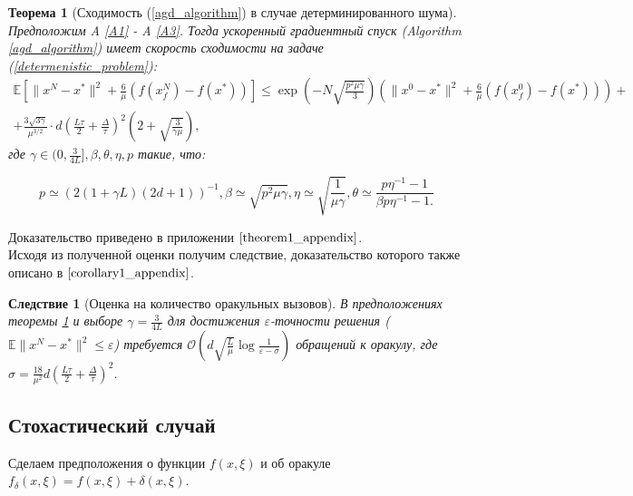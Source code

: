 \documentclass{article}
\newtheorem{theorem}{Теорема}
\newtheorem{corollary}{Следствие}
\begin{document}
\begin{theorem}[Сходимость (\ref{agd_algorithm}) в случае детерминированного шума]\label{theorem1}
  Предположим A \ref{A1} - A \ref{A3}. Тогда ускоренный градиентный спуск (Algorithm \ref{agd_algorithm}) имеет скорость сходимости на задаче (\ref{determenistic_problem}):
  \begin{equation}
   \begin{aligned}
   \mathbb{E}\left[\|x^N - x^*\|^2 + \frac{6}{\mu} (f(x_f^N) - f(x^*))\right] \leqslant \exp\left(- N\sqrt{\frac{p^2\mu\gamma}{3}}\right) \left(\|x^0 - x^*\|^2 + \frac{6}{\mu} (f(x_f^0) - f(x^*))\right) +\\ +\frac{3 \sqrt{3\gamma}}{\mu^{3/2}} \cdot d \left(\frac{L\tau}{2} + \frac{\Delta}{\tau}\right)^2\left(2 + \sqrt{\frac{3}{\gamma\mu}}\right),
   \label{deterministic_convergence}
   \end{aligned}
  \end{equation}
  где $\gamma \in (0, \frac{3}{4L}], \beta, \theta, \eta, p$ такие, что:

  \begin{equation}
   p \simeq (2(1 + \gamma L)(2d + 1))^{-1}, \beta \simeq \sqrt{p^2 \mu \gamma}, \eta \simeq \sqrt{\frac{1}{\mu\gamma}}, \theta \simeq \frac{p \eta^{-1} - 1}{\beta p \eta^{-1} - 1.}
  \end{equation}

\end{theorem}

Доказательство приведено в приложении $\ref{theorem1_appendix}$.\\
Исходя из полученной оценки получим следствие, доказательство которого также описано в $\ref{corollary1_appendix}$.

\begin{corollary}[Оценка на количество оракульных вызовов]\label{corollary1}
 В предположениях теоремы \ref{theorem1} и выборе $\gamma = \frac{3}{4L}$ для достижения $\varepsilon$-точности решения ($\mathbb{E} \|x^N - x^*\|^2 \leqslant \varepsilon$) требуется $\mathcal{O}\left(d \sqrt{\frac{L}{\mu}} \log \frac{1}{\varepsilon - \sigma}\right)$ обращений к оракулу, где $\sigma = \frac{18}{\mu^2} d \left(\frac{L \tau}{2} + \frac{\Delta}{\tau}\right)^2$.
\end{corollary}

\subsection{Стохастический случай}
Сделаем предположения о функции $f(x, \xi)$ и об оракуле $f_\delta(x, \xi) = f(x, \xi) + \delta(x, \xi)$.
\end{document}
